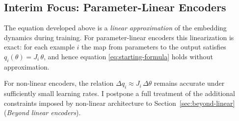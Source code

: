 \subsection{Interim Focus: Parameter-Linear Encoders}

The equation developed above is a \emph{linear approximation} of the embedding dynamics during training. For parameter-linear encoders this linearization is exact: for each example $i$ the map from parameters to the output satisfies $q_i(\theta)=J_i\,\theta$, and hence equation \eqref{eq:starting-formula} holds without approximation.

For non-linear encoders, the relation $\Delta q_i \approx J_i\,\Delta\theta$ remains accurate under sufficiently small learning rates. I postpone a full treatment of the additional constraints imposed by non-linear architecture to Section~\ref{sec:beyond-linear} (\emph{Beyond linear encoders}).

